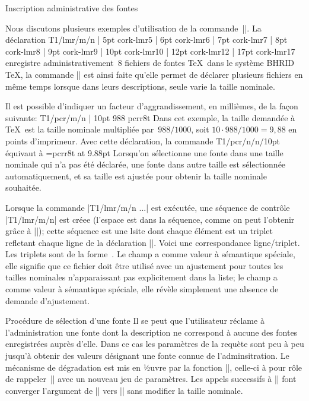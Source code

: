 \formalpar Inscription administrative des fontes

Nous discutons plusieurs exemples d'utilisation de la
commande~|\fontmatch|. La déclaration
\begincode
\fontmatch T1/lmr/m/n \with
|  5pt cork-lmr5
|  6pt cork-lmr6
|  7pt cork-lmr7
|  8pt cork-lmr8
|  9pt cork-lmr9
| 10pt cork-lmr10
| 12pt cork-lmr12
| 17pt cork-lmr17
\stop
\endcode
enregistre administrativement~$8$ fichiers de fontes \TeX\ dans le
système BHRID \TeX, la commande |\fontmatch| est ainsi faite qu'elle
permet de déclarer plusieurs fichiers en même temps lorsque dans leurs
descriptions, seule varie la taille nominale.

Il est possible d'indiquer un facteur d'aggrandissement, en millièmes,
de la façon suivante:
\begincode
\fontmatch T1/pcr/m/n \with
| 10pt 988 pcrr8t
\stop
\endcode
Dans cet exemple, la taille demandée à \TeX\ est la taille nominale
multipliée par~$988/1000$, soit $10 \cdot 988/1000 = 9,88$ en points
d'imprimeur. Avec cette déclaration, la commande
\begincode
\fontwish T1/pcr/n/n/10pt\as\courierten
\endcode
équivaut à
\begincode
\font\courierten=pcrr8t at 9.88pt
\endcode
Lorsqu'on sélectionne une fonte dans une taille nominale qui n'a pas
été déclarée, une fonte dans autre taille est sélectionnée
automatiquement, et sa taille est ajustée pour obtenir la taille
nominale souhaitée.

Lorsque la commande |\fontmatch T1/lmr/m/n \with...| est exécutée, une
séquence de contrôle |\fontmatch T1/lmr/m/n| est créee (l'espace est
dans la séquence, comme on peut l'obtenir grâce à |\csname|); cette
séquence est une lsite dont chaque élément est un triplet refletant
chaque ligne de la déclaration |\fontmatch|. Voici une correspondance
ligne/triplet.
\begindisplay
{}
\enddisplay
Les triplets sont de la
forme~. Le champ
 a \li{0pt} comme valeur à sémantique spéciale,
elle signifie que ce fichier  doit être utilisé avec un
ajustement pour toutes les tailles nominales n'apparaissant pas
explicitement dans la liste; le champ  a  comme
valeur à sémantique spéciale, elle révèle simplement une absence
de demande d'ajustement.

\formalpar Procédure de sélection d'une fonte
Il se peut que l'utilisateur réclame à l'administration une fonte dont
la description ne correspond à aucune des fontes enregistrées auprès
d'elle. Dans ce cas les paramètres de la requète sont 
peu à peu jusqu'à obtenir des valeurs désignant une fonte connue de
l'adminsitration. Le mécanisme de dégradation est mis en ½uvre par la
fonction |\fontwish@Y|, celle-ci à pour rôle de rappeler~|\fontwish@A|
avec un nouveau jeu de paramètres. Les appels successifs à
|\fontwish@Y| font converger l'argument de |\fontwish@A| vers
|| sans modifier la taille nominale.

